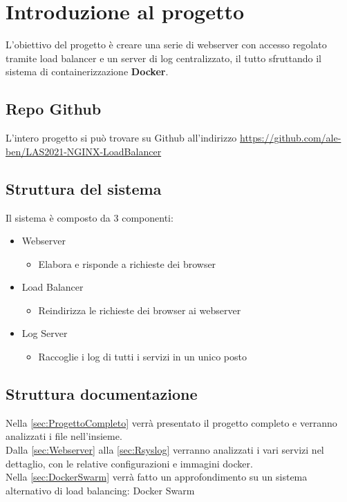 \documentclass[../DocumentazioneProgetto.tex]{subfiles}
\begin{document}
	\section{Introduzione al progetto}
	L'obiettivo del progetto è creare una serie di webserver con accesso regolato tramite load balancer e un server di log centralizzato, il tutto sfruttando il sistema di containerizzazione \textbf{Docker}.
	\subsection{Repo Github} 
	L'intero progetto si può trovare su Github all'indirizzo \href{https://github.com/ale-ben/LAS2021-NGINX-LoadBalancer}{https://github.com/ale-ben/LAS2021-NGINX-LoadBalancer}
	\subsection{Struttura del sistema} 
	\label{sec:IntroduzioneStrutturaSistema}
	Il sistema è composto da 3 componenti:
	\begin{itemize}
		\item Webserver
		\begin{itemize}
			\item Elabora e risponde a richieste dei browser
		\end{itemize}
		\item Load Balancer
		\begin{itemize}
			\item Reindirizza le richieste dei browser ai webserver
		\end{itemize}
		\item Log Server
		\begin{itemize}
			\item Raccoglie i log di tutti i servizi in un unico posto
		\end{itemize}
	\end{itemize}
	\subsection{Struttura documentazione}
	Nella \autoref{sec:ProgettoCompleto} verrà presentato il progetto completo e verranno analizzati i file nell'insieme.\\
	Dalla  \autoref{sec:Webserver} alla \autoref{sec:Rsyslog} verranno analizzati i vari servizi nel dettaglio, con le relative configurazioni e immagini docker.\\
	Nella \autoref{sec:DockerSwarm} verrà fatto un approfondimento su un sistema alternativo di load balancing: Docker Swarm
\end{document}
